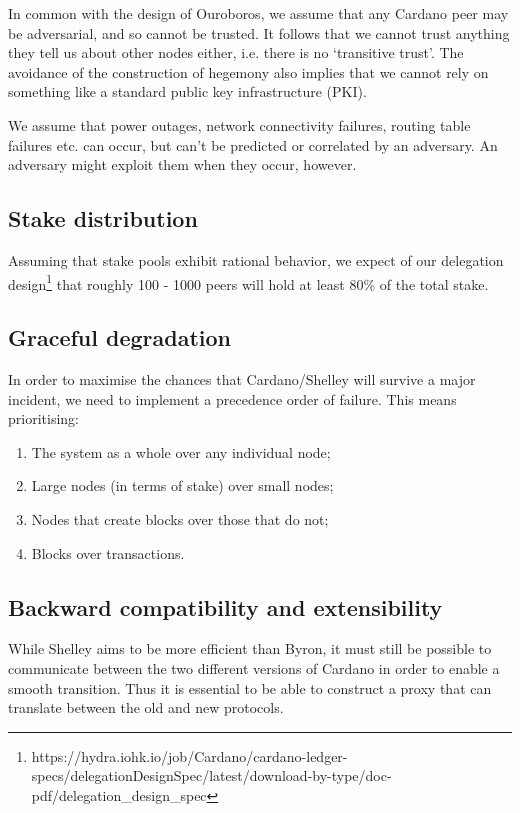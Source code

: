 \documentclass[11pt,a4paper]{article}
\begin{document}
In common with the design of Ouroboros, we assume that any Cardano peer
may be adversarial, and so cannot be trusted. It follows that we cannot
trust anything they tell us about other nodes either, i.e. there is no
`transitive trust'. The avoidance of the construction of hegemony also
implies that we cannot rely on something like a standard public key
infrastructure (PKI).

We assume that power outages, network connectivity failures, routing
table failures etc. can occur, but can't be predicted or correlated by
an adversary. An adversary might exploit them when they occur, however.

\subsection{Stake distribution}
\label{stake-distribution}

Assuming that stake pools exhibit rational behavior, we expect of our
delegation design\footnote{https://hydra.iohk.io/job/Cardano/cardano-ledger-specs/delegationDesignSpec/latest/download-by-type/doc-pdf/delegation\_design\_spec}
that roughly {100 - 1000 peers} will hold at least 80\% of the total stake.

\subsection{Graceful degradation}
\label{graceful-degradation}

In order to maximise the chances that Cardano/Shelley will survive a
major incident, we need to implement a precedence order of failure. This
means prioritising:

\begin{enumerate}
\item
  The system as a whole over any individual node;
\item
  Large nodes (in terms of stake) over small nodes;
\item
  Nodes that create blocks over those that do not;
\item
  Blocks over transactions.
\end{enumerate}

\subsection{Backward compatibility and extensibility}
\label{backward-compatibility-and-extensibility}

While Shelley aims to be more efficient than Byron, it must still be
possible to communicate between the two different versions of Cardano in
order to enable a smooth transition. Thus it is essential to be able to
construct a proxy that can translate between the old and new protocols.
\end{document}

